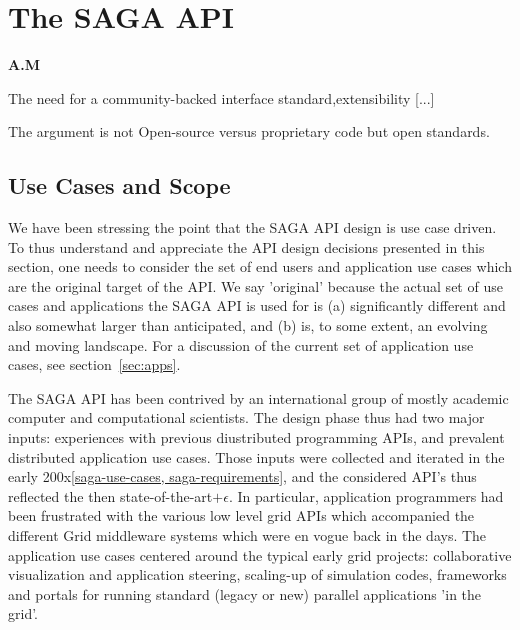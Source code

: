 
\section{The SAGA API} \textbf{A.M}

 The need for a community-backed interface standard,extensibility
 [...]


 The argument is not Open-source versus proprietary code but open
 standards. 



 \subsection{Use Cases and Scope}

  We have been stressing the point that the SAGA API design is use
  case driven.  To thus understand and appreciate the API design
  decisions presented in this section, one needs to consider the set
  of end users and application use cases which are the original
  target of the API.  We say 'original' because the actual set of use
  cases and applications the SAGA API is used for is (a) significantly
  different and also somewhat larger than anticipated, and (b) is, to
  some extent, an evolving and moving landscape.  For a discussion of
  the current set of application use cases, see
  section~\ref{sec:apps}.

  The SAGA API has been contrived by an international group of mostly
  academic computer and computational scientists.  The design phase
  thus had two major inputs: experiences with previous diustributed
  programming APIs, and prevalent distributed application use cases.
  Those inputs were collected and iterated in the early
  200x\ref{saga-use-cases, saga-requirements}, and the considered
  API's thus reflected the then state-of-the-art$+\epsilon$.  In
  particular, application programmers had been frustrated with the
  various low level grid APIs which accompanied the different Grid
  middleware systems which were en vogue back in the days.  The
  application use cases centered around the typical early grid
  projects: collaborative visualization and application steering,
  scaling-up of simulation codes, frameworks and portals for running
  standard (legacy or new) parallel applications 'in the grid'.

